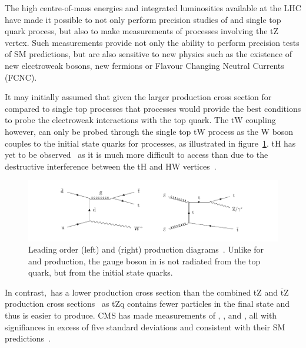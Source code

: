 The high centre-of-mass energies and integrated luminosities available at the LHC have made it possible to not only perform precision studies of \ttbar and single top quark process, but also to make measurements of processes involving the tZ vertex.
Such measurements provide not only the ability to perform precision tests of SM predictions, but are also sensitive to new physics such as the existence of new electroweak bosons, new fermions or Flavour Changing Neutral Currents (FCNC).

It may initially assumed that given the larger production cross section for \ttbar compared to single top processes that \ttbar processes would provide the best conditions to probe the electroweak interactions with the top quark.
The tW coupling however, can only be probed through the single top tW process as the W boson couples to the initial state quarks for \ttW processes, as illustrated in figure~\ref{fig:feyn_ttV}.
tH has yet to be observed~\cite{CMS:2018jsz} as it is much more difficult to access than \ttH due to the destructive interference between the tH and HW vertices~\cite{Maltoni:2001hu}.


\begin{figure}[htbp]
\centering
\includegraphics[width=\textwidth]{figs/top-physics/CMS-TOP-17-005_Figure_001.pdf}
\caption{Leading order \ttW (left) and \ttZ (right) production diagrams~\cite{Sirunyan:2017uzs}. Unlike for \ttZ and \ttH production, the gauge boson in \ttW is not radiated from the top quark, but from the initial state quarks.}
\label{fig:feyn_ttV}
\end{figure}

In contrast,~\ttZ has a lower production cross section than the combined tZ and $\overline{\text{t}}$Z production cross sections~\cite{Campbell:2013yla} as tZq contains fewer particles in the final state and thus is easier to produce.
CMS has made measurements of \ttH, \ttW, and \ttZ, all with signifiances in excess of five standard deviations and consistent with their SM predictions~\cite{Sirunyan:2017uzs,Sirunyan:2018hoz}.

